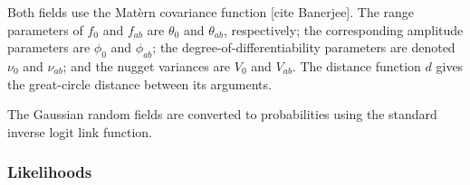 Both fields use the Mat\`ern covariance function [cite Banerjee]. The range parameters of $f_0$ and $f_{ab}$ are $\theta_0$ and $\theta_{ab}$, respectively; the corresponding amplitude parameters are $\phi_0$ and $\phi_{ab}$; the degree-of-differentiability parameters are denoted $\nu_{0}$ and $\nu_{ab}$; and the nugget variances are $V_0$ and $V_{ab}$. The distance function $d$ gives the great-circle distance between its arguments.

The Gaussian random fields are converted to probabilities using the standard inverse logit link function.

\subsubsection*{Likelihoods} %
\label{sec:likelihood}

